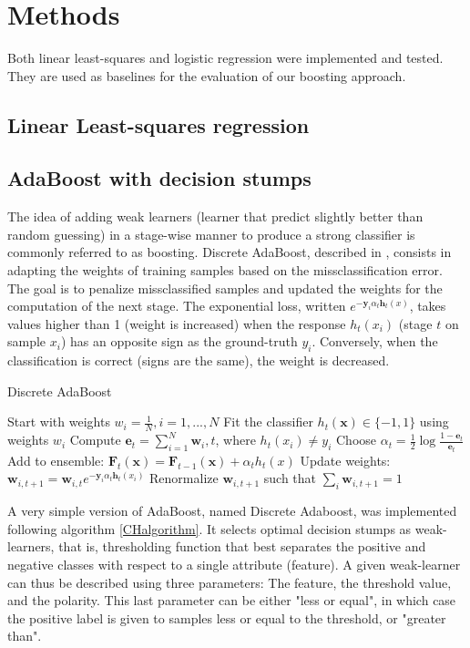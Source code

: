 \documentclass[10pt,conference,compsocconf]{IEEEtran}
\begin{document}
\section{Methods}
\label{sec:orgheadline10}
Both linear least-squares and logistic regression were implemented and tested. They are used as baselines for the evaluation of our boosting approach.
\subsection{Linear Least-squares regression}
\label{sec:orgheadline8}

\subsection{AdaBoost with decision stumps}
\label{sec:orgheadline9}
The idea of adding weak learners (learner that predict slightly better than random guessing) in a stage-wise manner to produce a strong classifier is commonly referred to as boosting. Discrete AdaBoost, described in \cite{friedman98}, consists in adapting the weights of training samples based on the missclassification error. The goal is to penalize missclassified samples and updated the weights for the computation of the next stage.
The exponential loss, written \(e^{-\bm{y}_i \alpha_t \bm{h}_t(x)}\), takes values higher than 1 (weight is increased) when the response \(h_t(x_i)\) (stage \(t\) on sample \(x_i\)) has an opposite sign as the ground-truth \(y_i\). Conversely, when the classification is correct (signs are the same), the weight is decreased.

\begin{algorithm}
\caption{Discrete AdaBoost}
\label{CHalgorithm}
\begin{algorithmic}[1]
\State Start with weights $w_i = \frac{1}{N}, i=1,...,N$
\State Fit the classifier $h_t(\bm{x}) \in \{-1,1\}$ using weights $w_i$
\State Compute $\bm{e}_t = \sum_{i=1}^N{\bm{w}_i,t}$, where $h_t(x_i) \neq y_i$
\State Choose $\alpha_t = \frac{1}{2} \log{\frac{1-\bm{e}_t}{\bm{e}_t}}$
\State Add to ensemble: $\bm{F}_t(\bm{x}) = \bm{F}_{t-1}(\bm{x}) + \alpha_t h_t(x)$ 
\State Update weights: $\bm{w}_{i,t+1} = \bm{w}_{i,t} e^{-\bm{y}_i \alpha_t \bm{h}_t(x_i)}$ 
\State Renormalize $\bm{w}_{i,t+1}$ such that $\sum_i{\bm{w}_{i,t+1}} = 1$
\EndFor
\EndProcedure
\end{algorithmic}
\end{algorithm}

A very simple version of AdaBoost, named Discrete Adaboost, was implemented following algorithm \ref{CHalgorithm}. It selects optimal decision stumps as weak-learners, that is, thresholding function that best separates the positive and negative classes with respect to a single attribute (feature). A given weak-learner can thus be described using three parameters: The feature, the threshold value, and the polarity. This last parameter can be either "less or equal", in which case the positive label is given to samples less or equal to the threshold, or "greater than".
\end{document}
